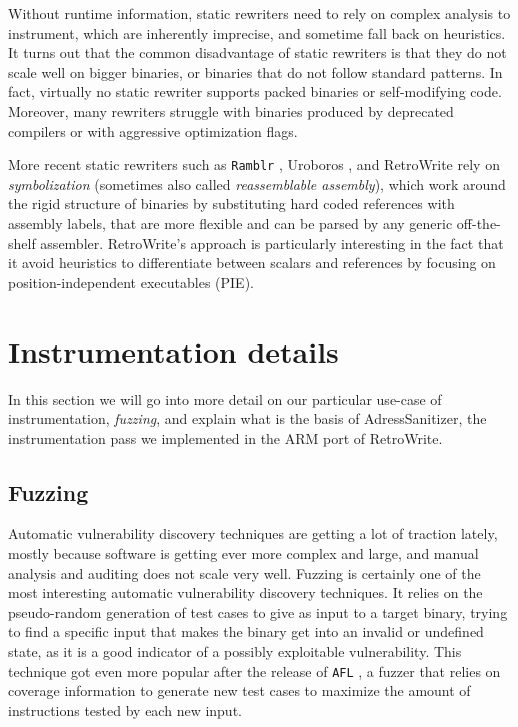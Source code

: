 \documentclass[a4paper,11pt,oneside]{report}
\newcommand{\sysname}{RetroWrite\xspace}
\begin{document}
Without runtime information, static rewriters need to rely on complex analysis 
to instrument, which are inherently imprecise, and sometime fall back on 
heuristics. It turns out that the common disadvantage of static rewriters is 
that they do not scale well on bigger binaries, or binaries that do not follow 
standard patterns. In fact, virtually no static rewriter supports packed 
binaries or self-modifying code. Moreover, many rewriters struggle with 
binaries produced by deprecated compilers or with aggressive optimization 
flags. 

More recent static rewriters such as \texttt{Ramblr} \cite{ramblr}, Uroboros 
\cite{uroboros}, and \sysname rely on \emph{symbolization} (sometimes also 
called \emph{reassemblable assembly}), which work around the rigid structure of 
binaries by substituting hard coded references with assembly labels, that are 
more flexible and can be parsed by any generic off-the-shelf assembler.  
\sysname's approach is particularly interesting in the fact that it avoid 
heuristics to differentiate between scalars and references by focusing on 
position-independent executables (PIE). 



\section{Instrumentation details}
In this section we will go into more detail on our particular use-case of 
instrumentation, \emph{fuzzing}, and explain what is the basis of 
AdressSanitizer, the instrumentation pass we implemented in the ARM port of 
\sysname. 

\subsection{Fuzzing}
Automatic vulnerability discovery techniques are getting a lot of traction 
lately, mostly because software is getting ever more complex and large, and 
manual analysis and auditing does not scale very well. Fuzzing is certainly one 
of the most interesting automatic vulnerability discovery techniques.  It 
relies on the pseudo-random generation of test cases to give as input to a 
target binary, trying to find a specific input that makes the binary get into 
an invalid or undefined state, as it is a good indicator of a possibly 
exploitable vulnerability. This technique got even more popular after the 
release of \texttt{AFL} \cite{afl}, a fuzzer that relies on coverage  
information to generate new test cases to maximize the amount of instructions 
tested by each new input. 
\end{document}
